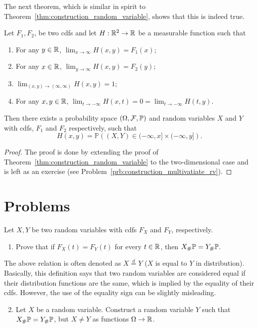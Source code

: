 The next theorem, which is similar in spirit to Theorem~\ref{thm:construction_random_variable}, shows that this is indeed true. 

\begin{theorem}\label{thm:construction_multivatiate_rv}
Let $F_1, F_2$, be two cdfs and let $H: \mathbb R^2 \to \mathbb R$ be a measurable function such that
\begin{enumerate}
\item For any $y \in \mathbb R$, $\lim_{x \to \infty} H(x,y) = F_1(x)$; 
\item For any $x \in \mathbb R$, $\lim_{y \to \infty} H(x,y) = F_2(y)$;
\item $\lim_{(x,y) \to (\infty, \infty)} H(x,y) = 1$;
\item For any $x,y \in \mathbb R$, $\lim_{t \to -\infty} H(x,t) = 0 = \lim_{t \to -\infty} H(t,y)$.
\end{enumerate}
Then there exists a probability space $(\Omega, \mathcal F, \mathbb{P})$ and random variables $X$ and $Y$ with cdfs, $F_1$ and $F_2$ respectively, such that
\[
	H(x,y) = \mathbb{P}\left((X,Y) \in (-\infty ,x] \times (-\infty, y]\right).
\]
\end{theorem}

\begin{proof}
The proof is done by extending the proof of Theorem~\ref{thm:construction_random_variable} to the two-dimensional case and is left as an exercise (see Problem~\ref{prb:construction_multivatiate_rv}).
\end{proof}

\section{Problems}

\begin{problem}
Let $X,Y$ be two random variables with cdfs $F_X$ and $F_Y$, respectively. 
\begin{enumerate}[label=(\alph*)]
\item Prove that if $F_X(t) = F_Y(t)$ for every $t \in \mathbb R$, then $X_\# \mathbb P = Y_\# \mathbb P$. 
\end{enumerate}
The above relation is often denoted as $X \stackrel{d}{=} Y$ ($X$ is equal to $Y$ in distribution). Basically, this definition says that two random variables are considered equal if their distribution functions are the same, which is implied by the equality of their cdfs. However, the use of the equality sign can be slightly misleading.
\begin{enumerate}[label=(\alph*)]
\setcounter{enumi}{1}
\item Let $X$ be a random variable. Construct a random variable $Y$ such that $X_\# \mathbb P = Y_\# \mathbb P$, but $X \ne Y$ as functions $\Omega \to \mathbb R$.
\end{enumerate}
\end{problem}


